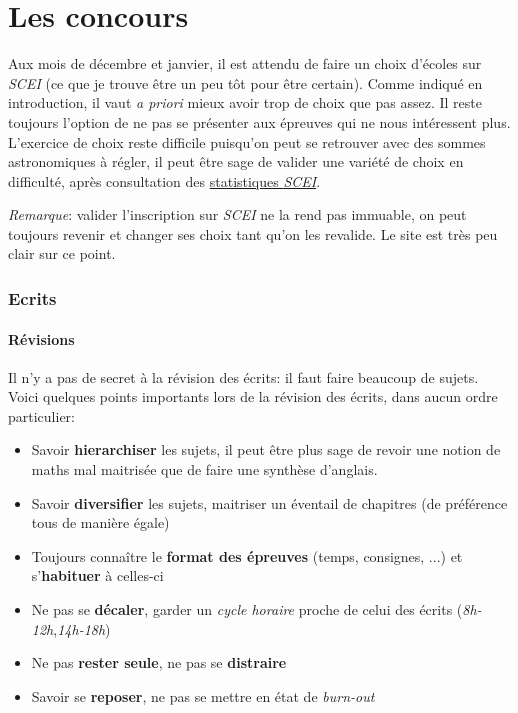 \documentclass{article}
\begin{document}
\part{Les concours}
Aux mois de décembre et janvier, il est attendu de faire un choix d'écoles sur \textit{SCEI} (ce que je trouve être un peu tôt pour être certain).
Comme indiqué en introduction, il vaut \textit{a priori} mieux avoir trop de choix que pas assez.
Il reste toujours l'option de ne pas se présenter aux épreuves qui ne nous intéressent plus.
L'exercice de choix reste difficile puisqu'on peut se retrouver avec des sommes astronomiques à régler, il peut être sage de valider une variété de choix en difficulté, après consultation des \href{https://www.scei-concours.fr/statistiques.php}{statistiques \textit{SCEI}}.

\textit{Remarque}: valider l'inscription sur \textit{SCEI} ne la rend pas immuable, on peut toujours revenir et changer ses choix tant qu'on les revalide.
Le site est très peu clair sur ce point.

\section{Ecrits}
\subsection{Révisions}
Il n'y a pas de secret à la révision des écrits: il faut faire beaucoup de sujets.
Voici quelques points importants lors de la révision des écrits, dans aucun ordre particulier:


\begin{itemize}
\item  Savoir \textbf{hierarchiser} les sujets, il peut être plus sage de revoir une notion de maths mal maitrisée que de faire une synthèse d'anglais.
\item  Savoir \textbf{diversifier} les sujets, maitriser un éventail de chapitres (de préférence tous de manière égale)
\item  Toujours connaître le \textbf{format des épreuves} (temps, consignes, ...) et s'\textbf{habituer} à celles-ci
\item  Ne pas se \textbf{décaler}, garder un \textit{cycle horaire} proche de celui des écrits (\textit{8h-12h},\textit{14h-18h})
\item  Ne pas \textbf{rester seul\textperiodcentered e}, ne pas se \textbf{distraire}
\item  Savoir se \textbf{reposer}, ne pas se mettre en état de \textit{burn-out}

\end{itemize}
\end{document}
